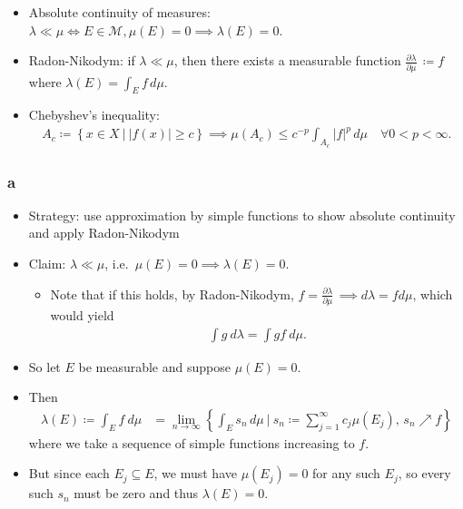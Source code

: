 \begin{solution}

\hfill

\begin{concept}

\hfill

\begin{itemize}
\tightlist
\item
  Absolute continuity of measures:
  \(\lambda \ll \mu \iff E\in\mathcal{M}, \mu(E) = 0 \implies \lambda(E) = 0\).
\item
  Radon-Nikodym: if \(\lambda \ll \mu\), then there exists a measurable
  function \({\frac{\partial \lambda}{\partial \mu}\,} \coloneqq f\)
  where \(\lambda(E) = \int_E f \,d\mu\).
\item
  Chebyshev's inequality:
  \begin{align*}  
  A_c \coloneqq\left\{{ x\in X {~\mathrel{\Big|}~}{\left\lvert {f(x)} \right\rvert} \geq c  }\right\} \implies \mu(A_c) \leq c^{-p} \int_{A_c} {\left\lvert {f} \right\rvert}^p \,d\mu \quad \forall 0 < p < \infty
  .\end{align*}
\end{itemize}

\end{concept}

\hypertarget{a-6}{%
\subsubsection{a}\label{a-6}}

\begin{itemize}
\item
  Strategy: use approximation by simple functions to show absolute
  continuity and apply Radon-Nikodym
\item
  Claim: \(\lambda \ll \mu\),
  i.e.~\(\mu(E) = 0 \implies \lambda(E) = 0\).

  \begin{itemize}
  \tightlist
  \item
    Note that if this holds, by Radon-Nikodym,
    \(f = {\frac{\partial \lambda}{\partial \mu}\,} \implies d\lambda = f d\mu\),
    which would yield
    \begin{align*}  
    \int g ~d\lambda = \int g f ~d\mu
    .\end{align*}
  \end{itemize}
\item
  So let \(E\) be measurable and suppose \(\mu(E) = 0\).
\item
  Then
  \begin{align*}
  \lambda(E) \coloneqq\int_E f ~d\mu 
  &= \lim_{n\to\infty} \left\{{\int_E s_n \,d\mu {~\mathrel{\Big|}~}s_n \coloneqq\sum_{j=1}^\infty c_j \mu(E_j),\, s_n \nearrow f}\right\}
  \end{align*}
  where we take a sequence of simple functions increasing to \(f\).
\item
  But since each \(E_j \subseteq E\), we must have \(\mu(E_j) = 0\) for
  any such \(E_j\), so every such \(s_n\) must be zero and thus
  \(\lambda(E) = 0\).
\end{itemize}


\end{solution}
